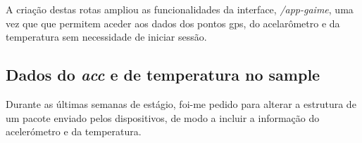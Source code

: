 A criação destas rotas ampliou as funcionalidades da interface, \textit{/app-gaime}, uma vez que que permitem aceder aos dados dos pontos \acs{gps}, do acelarômetro e da temperatura sem necessidade de iniciar sessão.


\clearpage
\subsection{Dados do \textit{acc} e de temperatura no sample} %






Durante as últimas semanas de estágio, foi-me pedido para alterar a estrutura de um pacote enviado pelos dispositivos, de modo a incluir a informação do acelerómetro e da temperatura.


